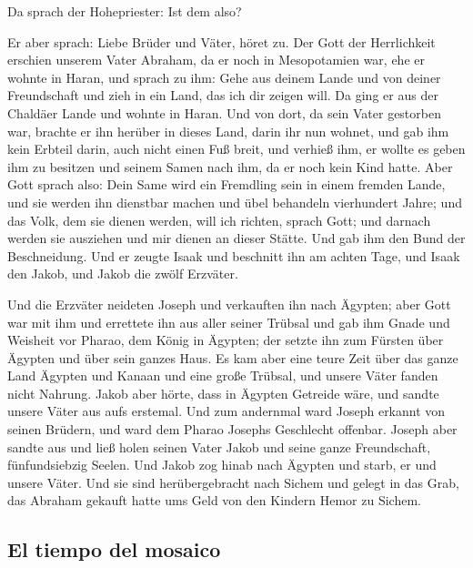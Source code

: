  Da sprach der Hohepriester: Ist dem also?

 Er aber sprach: Liebe Brüder und Väter, höret zu. Der
Gott der Herrlichkeit erschien unserem Vater Abraham, da er noch in
Mesopotamien war, ehe er wohnte in Haran,  und sprach zu
ihm: Gehe aus deinem Lande und von deiner Freundschaft und zieh in ein
Land, das ich dir zeigen will.  Da ging er aus der
Chaldäer Lande und wohnte in Haran. Und von dort, da sein Vater
gestorben war, brachte er ihn herüber in dieses Land, darin ihr nun
wohnet,  und gab ihm kein Erbteil darin, auch nicht einen
Fuß breit, und verhieß ihm, er wollte es geben ihm zu besitzen und
seinem Samen nach ihm, da er noch kein Kind hatte.  Aber
Gott sprach also: Dein Same wird ein Fremdling sein in einem fremden
Lande, und sie werden ihn dienstbar machen und übel behandeln
vierhundert Jahre;  und das Volk, dem sie dienen werden,
will ich richten, sprach Gott; und darnach werden sie ausziehen und mir
dienen an dieser Stätte.  Und gab ihm den Bund der
Beschneidung. Und er zeugte Isaak und beschnitt ihn am achten Tage, und
Isaak den Jakob, und Jakob die zwölf Erzväter.

 Und die Erzväter neideten Joseph und verkauften ihn nach
Ägypten; aber Gott war mit ihm  und errettete ihn aus
aller seiner Trübsal und gab ihm Gnade und Weisheit vor Pharao, dem
König in Ägypten; der setzte ihn zum Fürsten über Ägypten und über sein
ganzes Haus.  Es kam aber eine teure Zeit über das ganze
Land Ägypten und Kanaan und eine große Trübsal, und unsere Väter fanden
nicht Nahrung.  Jakob aber hörte, dass in Ägypten
Getreide wäre, und sandte unsere Väter aus aufs erstemal.
 Und zum andernmal ward Joseph erkannt von seinen
Brüdern, und ward dem Pharao Josephs Geschlecht offenbar.
 Joseph aber sandte aus und ließ holen seinen Vater Jakob
und seine ganze Freundschaft, fünfundsiebzig Seelen.  Und
Jakob zog hinab nach Ägypten und starb, er und unsere Väter.
 Und sie sind herübergebracht nach Sichem und gelegt in
das Grab, das Abraham gekauft hatte ums Geld von den Kindern Hemor zu
Sichem.

\hypertarget{el-tiempo-del-mosaico}{%
\subsection{El tiempo del mosaico}\label{el-tiempo-del-mosaico}}

